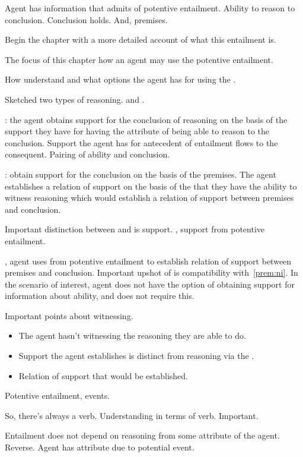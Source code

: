 \begin{note}
  Agent has information that admits of potentive entailment.
  Ability to reason to conclusion.
  Conclusion holds.
  And, premises.

  Begin the chapter with a more detailed account of what this entailment is.

  The focus of this chapter how an agent may use the potentive entailment.

  How understand and what options the agent has for using the \gen{}.

  Sketched two types of reasoning.
  \AR{} and \WR{}.

  \AR{}: the agent obtains support for the conclusion of reasoning on the basis of the support they have for having the attribute of being able to reason to the conclusion.
  Support the agent has for antecedent of entailment flows to the consequent.
  Pairing of ability and conclusion.

  \WR{}: obtain support for the conclusion on the basis of the premises.
  The agent establishes a relation of support on the basis of the \gen{} that they have the ability to witness reasoning which would establish a relation of support between premises and conclusion.

  Important distinction between \AR{} and \WR{} is support.
  \AR{}, support from potentive entailment.

  \WR{}, agent uses \gen{} from potentive entailment to establish relation of support between premises and conclusion.
  Important upshot of \WR{} is compatibility with~\ref{prem:ni}.
  In the scenario of interest, agent does not have the option of obtaining support for information about ability, and \WR{} does not require this.

  Important points about witnessing.
  \begin{itemize}
  \item The agent hasn't witnessing the reasoning they are able to do.
  \item Support the agent establishes is distinct from reasoning via the \gen{}.
  \item Relation of support that would be established.
  \end{itemize}

  Potentive entailment, events.

  So, there's always a verb.
  Understanding in terms of verb.
  Important.

  Entailment does not depend on reasoning from some attribute of the agent.
  Reverse.
  Agent has attribute due to potential event.


\end{note}
